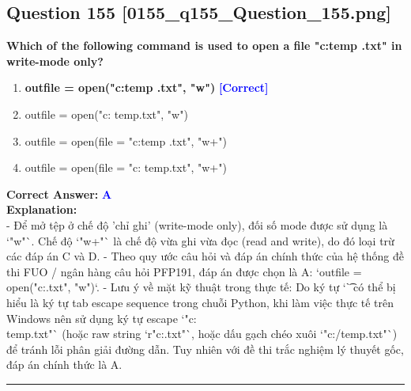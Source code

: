 \documentclass[11pt,a4paper]{article}
\begin{document}
\begin{minipage}{\textwidth}
\subsection*{Question 155 \quad \footnotesize{[0155_q155_Question_155.png]}}
\noindent \textbf{Which of the following command is used to open a file "c:temp .txt" in write-mode only?}

\begin{enumerate}[label=\Alph*.]
    \item \textbf{outfile = open("c:temp .txt", "w")} \hfill \textcolor{blue}{\textbf{[Correct]}}
    \item outfile = open("c: temp.txt", "w")
    \item outfile = open(file = "c:temp .txt", "w+")
    \item outfile = open(file = "c: temp.txt", "w+")
\end{enumerate}

\noindent \textbf{Correct Answer:} \textcolor{blue}{\textbf{A}} \\[4pt]
\noindent \textbf{Explanation:}\\
- Để mở tệp ở chế độ 'chỉ ghi' (write-mode only), đối số mode được sử dụng là `"w"`. Chế độ `"w+"` là chế độ vừa ghi vừa đọc (read and write), do đó loại trừ các đáp án C và D.\newline
- Theo quy ước câu hỏi và đáp án chính thức của hệ thống đề thi FUO / ngân hàng câu hỏi PFP191, đáp án được chọn là A: `outfile = open("c:\temp.txt", "w")`.\newline
- Lưu ý về mặt kỹ thuật trong thực tế: Do ký tự `\t` có thể bị hiểu là ký tự tab escape sequence trong chuỗi Python, khi làm việc thực tế trên Windows nên sử dụng ký tự escape `"c:\\temp.txt"` (hoặc raw string `r"c:\temp.txt"`, hoặc dấu gạch chéo xuôi `"c:/temp.txt"`) để tránh lỗi phân giải đường dẫn. Tuy nhiên với đề thi trắc nghiệm lý thuyết gốc, đáp án chính thức là A.
\end{minipage}
\vspace{0.8cm}
\hrule
\vspace{0.5cm}
\end{document}
